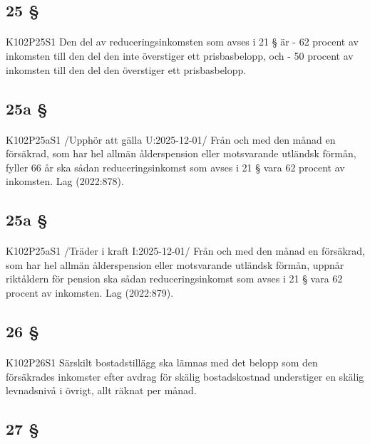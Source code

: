 \documentclass[a4paper,notitlepage,openany,10pt]{book}
\begin{document}
\subsection*{25 §}
\paragraph*{}
{\tiny K102P25S1}
Den del av reduceringsinkomsten som avses i 21 § är
\newline - 62 procent av inkomsten till den del den inte överstiger ett prisbasbelopp, och
\newline - 50 procent av inkomsten till den del den överstiger ett prisbasbelopp.
\subsection*{25a §}
\paragraph*{}
{\tiny K102P25aS1}
/Upphör att gälla U:2025-12-01/
Från och med den månad en försäkrad, som har hel allmän ålderspension eller motsvarande utländsk förmån, fyller 66 år ska sådan reduceringsinkomst som avses i 21 § vara 62 procent av inkomsten.
Lag (2022:878).
\subsection*{25a §}
\paragraph*{}
{\tiny K102P25aS1}
/Träder i kraft I:2025-12-01/
Från och med den månad en försäkrad, som har hel allmän ålderspension eller motsvarande utländsk förmån, uppnår riktåldern för pension ska sådan reduceringsinkomst som avses i 21 § vara 62 procent av inkomsten.
Lag (2022:879).
\subsection*{26 §}
\paragraph*{}
{\tiny K102P26S1}
Särskilt bostadstillägg ska lämnas med det belopp som den försäkrades inkomster efter avdrag för skälig bostadskostnad understiger en skälig levnadsnivå i övrigt, allt räknat per månad.
\subsection*{27 §}
\end{document}
